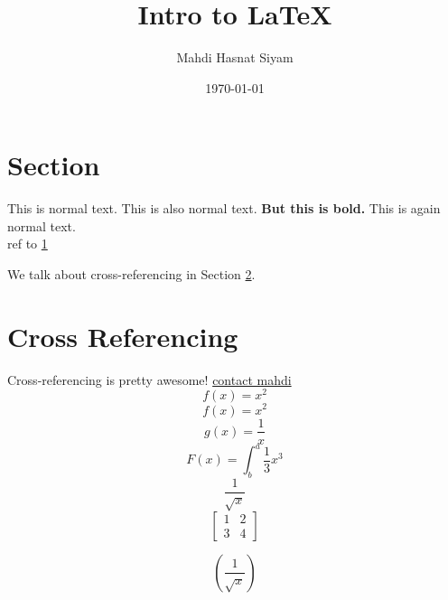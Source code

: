 \documentclass[18pt,a4paper]{article}
\author{Mahdi Hasnat Siyam}
\title{Intro to {\LaTeX}}
\date{\today}
\begin{document}
\maketitle   
\tableofcontents
\newpage
\section{Section }\label{sec:s1}
This is normal text.
 {
 This is also normal text.
\bfseries
 But this is bold.
 }
 This is again normal text.
 \\
 ref to \ref{sec:s1}

We talk about cross-referencing in Section \ref{sec:cr}.

\section{Cross Referencing}\label{sec:cr}
Cross-referencing is pretty awesome!
\href{mailto:mahdibuet3@gmail.com}{contact mahdi}
\begin{equation*}
	f(x) = x^2
\end{equation*}
\begin{equation*}
	f(x) = x^2
\end{equation*}
\begin{equation*}
	g(x) = \frac{1}{x}
\end{equation*}
\begin{equation*}
	F(x) = \int^a_b \frac{1}{3}x^3
\end{equation*}
\begin{equation*}
	\frac{1}{\sqrt{x}}
\end{equation*}
\begin{equation}
	\left[
	\begin{matrix}
		1 & 2 \\
		3 & 4
	\end{matrix}	
	\right]
\end{equation}

\begin{equation*}
	\left( \frac{1}{\sqrt{x}} \right)
\end{equation*}
\end{document}
